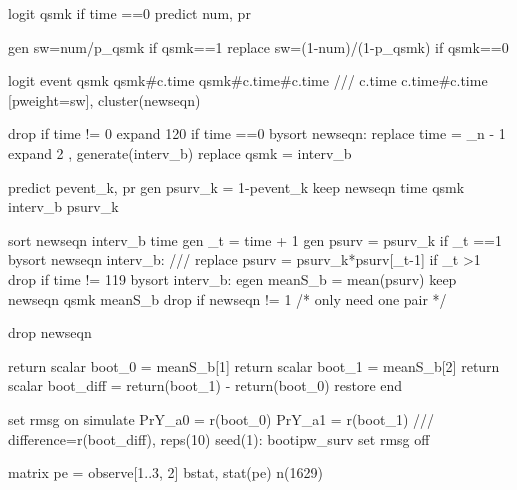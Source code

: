 \documentclass[
  10pt,
  a4paper,
]{book}
\newenvironment{Shaded}{\begin{snugshade}}{\end{snugshade}}
\newcommand{\CommentTok}[1]{\textcolor[rgb]{0.37,0.37,0.37}{#1}}
\newcommand{\DataTypeTok}[1]{\textcolor[rgb]{0.68,0.00,0.00}{#1}}
\newcommand{\DecValTok}[1]{\textcolor[rgb]{0.68,0.00,0.00}{#1}}
\newcommand{\FunctionTok}[1]{\textcolor[rgb]{0.28,0.35,0.67}{#1}}
\newcommand{\KeywordTok}[1]{\textcolor[rgb]{0.00,0.46,0.62}{#1}}
\newcommand{\NormalTok}[1]{\textcolor[rgb]{0.00,0.46,0.62}{#1}}
\begin{document}
\begin{Shaded}
\begin{Highlighting}[]
\KeywordTok{logit}\NormalTok{ qsmk }\KeywordTok{if}\NormalTok{ time ==0 }
\KeywordTok{predict}\NormalTok{ num, pr}

\KeywordTok{gen} \KeywordTok{sw}\NormalTok{=num/p\_qsmk }\KeywordTok{if}\NormalTok{ qsmk==1}
\KeywordTok{replace} \KeywordTok{sw}\NormalTok{=(1{-}num)/(1{-}p\_qsmk) }\KeywordTok{if}\NormalTok{ qsmk==0}

\KeywordTok{logit}\NormalTok{ event qsmk qsmk\#c.time qsmk\#c.time\#c.time }\CommentTok{///}
\NormalTok{  c.time c.time\#c.time [}\KeywordTok{pweight}\NormalTok{=}\KeywordTok{sw}\NormalTok{], }\KeywordTok{cluster}\NormalTok{(newseqn) }
    
\KeywordTok{drop} \KeywordTok{if}\NormalTok{ time != 0}
\NormalTok{expand 120 }\KeywordTok{if}\NormalTok{ time ==0 }
\KeywordTok{bysort}\NormalTok{ newseqn: }\KeywordTok{replace}\NormalTok{ time = }\DataTypeTok{\_n}\NormalTok{ {-} 1        }
\NormalTok{expand 2 , }\KeywordTok{generate}\NormalTok{(interv\_b) }
\KeywordTok{replace}\NormalTok{ qsmk = interv\_b }
        
\KeywordTok{predict}\NormalTok{ pevent\_k, pr}
\KeywordTok{gen}\NormalTok{ psurv\_k = 1{-}pevent\_k}
\KeywordTok{keep}\NormalTok{ newseqn time qsmk interv\_b psurv\_k }

\KeywordTok{sort}\NormalTok{ newseqn interv\_b time}
\KeywordTok{gen}\NormalTok{ \_t = time + 1}
\KeywordTok{gen}\NormalTok{ psurv = psurv\_k }\KeywordTok{if}\NormalTok{ \_t ==1       }
\KeywordTok{bysort}\NormalTok{ newseqn interv\_b: }\CommentTok{///}
  \KeywordTok{replace}\NormalTok{ psurv = psurv\_k*psurv[\_t{-}1] }\KeywordTok{if}\NormalTok{ \_t \textgreater{}1 }
\KeywordTok{drop} \KeywordTok{if}\NormalTok{ time != 119}
\KeywordTok{bysort}\NormalTok{ interv\_b: }\KeywordTok{egen}\NormalTok{ meanS\_b = }\KeywordTok{mean}\NormalTok{(psurv)}
\KeywordTok{keep}\NormalTok{ newseqn qsmk  meanS\_b }
\KeywordTok{drop} \KeywordTok{if}\NormalTok{ newseqn != 1  }\CommentTok{/* only need one pair */}
    
\KeywordTok{drop}\NormalTok{ newseqn        }
        
\FunctionTok{return} \FunctionTok{scalar}\NormalTok{ boot\_0 = meanS\_b[1]}
\FunctionTok{return} \FunctionTok{scalar}\NormalTok{ boot\_1 = meanS\_b[2]}
\FunctionTok{return} \FunctionTok{scalar}\NormalTok{  boot\_diff = }\FunctionTok{return}\NormalTok{(boot\_1) {-} }\FunctionTok{return}\NormalTok{(boot\_0)}
\KeywordTok{restore}
\KeywordTok{end}     

\KeywordTok{set} \DecValTok{rmsg} \KeywordTok{on}
\KeywordTok{simulate}\NormalTok{ PrY\_a0 = }\FunctionTok{r}\NormalTok{(boot\_0) PrY\_a1 = }\FunctionTok{r}\NormalTok{(boot\_1) }\CommentTok{///}
\NormalTok{  difference=}\FunctionTok{r}\NormalTok{(boot\_diff), reps(10) }\DecValTok{seed}\NormalTok{(1): bootipw\_surv}
\KeywordTok{set} \DecValTok{rmsg} \KeywordTok{off} 
 
\FunctionTok{matrix}\NormalTok{ pe = observe[1..3, 2]\textquotesingle{}}
\KeywordTok{bstat}\NormalTok{, stat(pe) n(1629)}
\end{Highlighting}
\end{Shaded}
\end{document}
